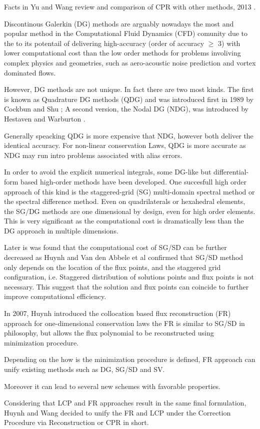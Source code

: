 \begin{frame}[allowframebreaks]
 Facts in Yu and Wang review and comparison of CPR with other methods, 2013 \cite{Yu&Wang2013}. 
 \begin{orangeitemize}
  \item Discontinous Galerkin (DG) methods are arguably nowadays the most and popular method in the Computational Fluid Dynamics (CFD) comunity due to the to its potentail of delivering high-accuracy (order of accuracy $\ge$ 3) with lower computational cost than the low order methods for problems involiving complex physics and geometries, such as aero-acoustic noise prediction and vortex dominated flows.
  \item However, DG methods are not unique. In fact there are two most kinds. The first is known as Quadrature DG methods (QDG) and was introduced first in 1989 by Cockbun and Shu \cite{Cockburn&Shu1989a,CockburnLin&Shu1989b}; A second version, the Nodal DG (NDG), was introduced by Hestaven and Warburton \cite{hesthaven2008}.
  \item Generally speacking QDG is more expensive that NDG, however both deliver the identical accuracy. For non-linear conservation Laws, QDG is more accurate as NDG may run intro problems associated with alias errors. 
  \item In order to avoid the explicit numerical integrals, some DG-like but differential-form based high-order methods have been developed. One succesfull high order approach of this kind is the staggered-grid (SG) multi-domain spectral method or the spectral difference method. Even on quadrilaterals or hexahedral elements, the SG/DG methods are one dimensional by design, even for high order elements. This is very significant as the computational cost is dramatically less than the DG approach in multiple dimensions.
  \item Later is was found that the computational cost of SG/SD can be further decreased as Huynh \cite{Huynh2007} and Van den Abbele et al \cite{Abbele} confirmed that SG/SD method only depends on the location of the flux points, and the staggered grid configuration, i.e. Staggered distribution of solutions points and flux points is not necessary. This suggest that the solution and flux points can coincide to further improve computational efficiency.
  \item In 2007, Huynh introduced the collocation based flux reconstruction (FR) approach for one-dimensional conservation laws
 the FR is similar to SG/SD in philosophy, but allows the flux polynomial to be reconstructed using minimization procedure.
  \item Depending on the how is the minimization procedure is defined, FR approach can unify existing methods such as DG, SG/SD and SV. 
  \item Moreover it can lead to several new schemes with favorable properties.
  \item Considering that LCP and FR approaches result in the same final formulation, Huynh and Wang decided to unify the FR and LCP under the Correction Procedure via Reconstruction or CPR in short.
 \end{orangeitemize}
\end{frame}

